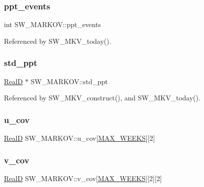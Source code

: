 \subsubsection{\texorpdfstring{ppt\+\_\+events}{ppt\_events}}
{\footnotesize\ttfamily int S\+W\+\_\+\+M\+A\+R\+K\+O\+V\+::ppt\+\_\+events}



Referenced by S\+W\+\_\+\+M\+K\+V\+\_\+today().

\mbox{\label{struct_s_w___m_a_r_k_o_v_aab76285bb8aafa89e3fa56340962d9a1}} 
\subsubsection{\texorpdfstring{std\+\_\+ppt}{std\_ppt}}
{\footnotesize\ttfamily \hyperlink{generic_8h_af1c105fd5732f70b91ddaeda0cc340e3}{RealD} $\ast$ S\+W\+\_\+\+M\+A\+R\+K\+O\+V\+::std\+\_\+ppt}



Referenced by S\+W\+\_\+\+M\+K\+V\+\_\+construct(), and S\+W\+\_\+\+M\+K\+V\+\_\+today().

\mbox{\label{struct_s_w___m_a_r_k_o_v_aef7204f999937d1b8f98310278c8e41c}} 
\subsubsection{\texorpdfstring{u\+\_\+cov}{u\_cov}}
{\footnotesize\ttfamily \hyperlink{generic_8h_af1c105fd5732f70b91ddaeda0cc340e3}{RealD} S\+W\+\_\+\+M\+A\+R\+K\+O\+V\+::u\+\_\+cov\mbox{[}\hyperlink{_times_8h_a424fe822ecd3e435c4d8dd339b57d829}{M\+A\+X\+\_\+\+W\+E\+E\+KS}\mbox{]}\mbox{[}2\mbox{]}}

\mbox{\label{struct_s_w___m_a_r_k_o_v_ac099b7578186299eae03a07324ae3948}} 
\subsubsection{\texorpdfstring{v\+\_\+cov}{v\_cov}}
{\footnotesize\ttfamily \hyperlink{generic_8h_af1c105fd5732f70b91ddaeda0cc340e3}{RealD} S\+W\+\_\+\+M\+A\+R\+K\+O\+V\+::v\+\_\+cov\mbox{[}\hyperlink{_times_8h_a424fe822ecd3e435c4d8dd339b57d829}{M\+A\+X\+\_\+\+W\+E\+E\+KS}\mbox{]}\mbox{[}2\mbox{]}\mbox{[}2\mbox{]}}

